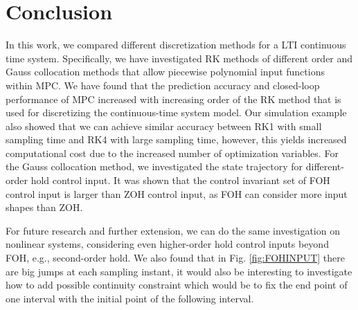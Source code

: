 \chapter{Conclusion}
In this work, we compared different discretization methods for a LTI continuous time system. Specifically, we have investigated RK methods of different order and Gauss collocation methods that allow piecewise polynomial input functions within MPC. We have found that the prediction accuracy and closed-loop performance of MPC increased with increasing order of the RK method that is used for discretizing the continuous-time system model. Our simulation example also showed that we can achieve similar accuracy between RK1 with small sampling time and RK4 with large sampling time, however, this yields increased computational cost due to the increased number of optimization variables. For the Gauss collocation method, we investigated the state trajectory for different-order hold control input. It was shown that the control invariant set of FOH control input is larger than ZOH control input, as FOH can consider more input shapes than ZOH.


For future research and further extension, we  can do the same investigation on nonlinear systems, considering even higher-order hold control inputs beyond FOH, e.g., second-order hold. We also found that in Fig. \ref{fig:FOHINPUT} there are big jumps at each sampling instant, it would also be interesting to investigate how to add possible continuity constraint which would be to fix the end point of one interval with the initial point of the following interval. 
